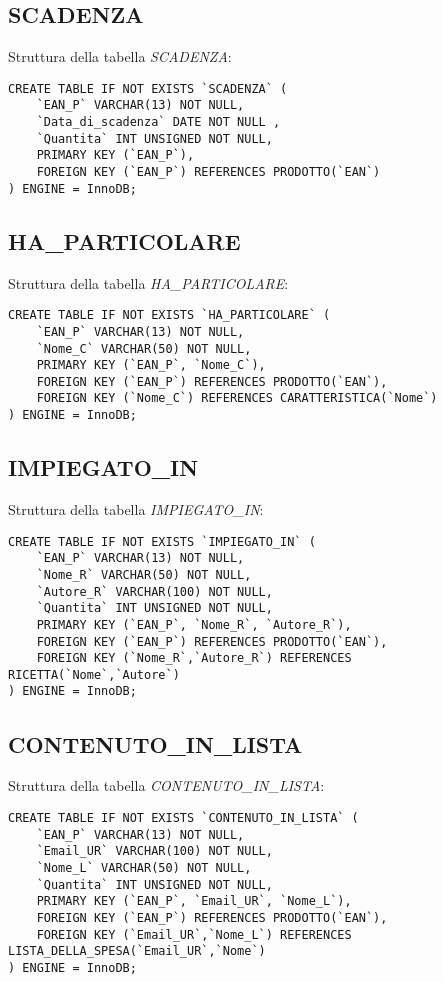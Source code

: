 \subsection{SCADENZA}
Struttura della tabella \emph{SCADENZA}:

\begin{lstlisting}
CREATE TABLE IF NOT EXISTS `SCADENZA` (
	`EAN_P` VARCHAR(13) NOT NULL,
	`Data_di_scadenza` DATE NOT NULL ,
	`Quantita` INT UNSIGNED NOT NULL,
	PRIMARY KEY (`EAN_P`),
	FOREIGN KEY (`EAN_P`) REFERENCES PRODOTTO(`EAN`)
) ENGINE = InnoDB;
\end{lstlisting}

\subsection{HA\_PARTICOLARE}
Struttura della tabella \emph{HA\_PARTICOLARE}:

\begin{lstlisting}
CREATE TABLE IF NOT EXISTS `HA_PARTICOLARE` (
	`EAN_P` VARCHAR(13) NOT NULL,
	`Nome_C` VARCHAR(50) NOT NULL,
	PRIMARY KEY (`EAN_P`, `Nome_C`),
	FOREIGN KEY (`EAN_P`) REFERENCES PRODOTTO(`EAN`),
	FOREIGN KEY (`Nome_C`) REFERENCES CARATTERISTICA(`Nome`)
) ENGINE = InnoDB;
\end{lstlisting}

\subsection{IMPIEGATO\_IN}
Struttura della tabella \emph{IMPIEGATO\_IN}:

\begin{lstlisting}
CREATE TABLE IF NOT EXISTS `IMPIEGATO_IN` (
	`EAN_P` VARCHAR(13) NOT NULL,
	`Nome_R` VARCHAR(50) NOT NULL,
	`Autore_R` VARCHAR(100) NOT NULL,
	`Quantita` INT UNSIGNED NOT NULL,
	PRIMARY KEY (`EAN_P`, `Nome_R`, `Autore_R`),
	FOREIGN KEY (`EAN_P`) REFERENCES PRODOTTO(`EAN`),
	FOREIGN KEY (`Nome_R`,`Autore_R`) REFERENCES RICETTA(`Nome`,`Autore`)
) ENGINE = InnoDB;
\end{lstlisting}

\subsection{CONTENUTO\_IN\_LISTA}
Struttura della tabella \emph{CONTENUTO\_IN\_LISTA}:

\begin{lstlisting}
CREATE TABLE IF NOT EXISTS `CONTENUTO_IN_LISTA` (
	`EAN_P` VARCHAR(13) NOT NULL,
	`Email_UR` VARCHAR(100) NOT NULL,
	`Nome_L` VARCHAR(50) NOT NULL,
	`Quantita` INT UNSIGNED NOT NULL,
	PRIMARY KEY (`EAN_P`, `Email_UR`, `Nome_L`),
	FOREIGN KEY (`EAN_P`) REFERENCES PRODOTTO(`EAN`),
	FOREIGN KEY (`Email_UR`,`Nome_L`) REFERENCES LISTA_DELLA_SPESA(`Email_UR`,`Nome`)
) ENGINE = InnoDB;
\end{lstlisting}

